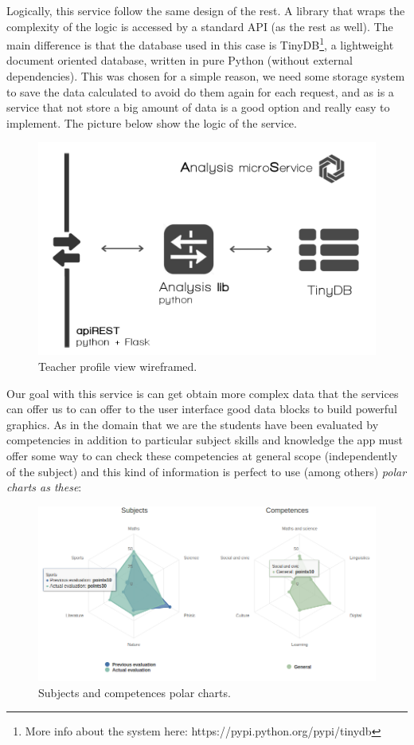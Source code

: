Logically, this service follow the same design of the rest. A library that wraps
the complexity of the logic is accessed by a standard API (as the rest as well).
The main difference is that the database used in this case is TinyDB\footnote{More
info about the system here: https://pypi.python.org/pypi/tinydb}, a lightweight
document oriented database, written in pure Python (without external dependencies).
\intro
This was chosen for a simple reason, we need some storage system to save the data
calculated to avoid do them again for each request, and as is a service that not
store a big amount of data is a good option and really easy to implement.
The picture below show the logic of the service.

\begin{figure}[H]
  \includegraphics[scale=0.3]{img/graphics/ams.png}
  \centering
  \caption{Teacher profile view wireframed.}
\end{figure}

\noindent Our goal with this service is can get obtain more complex data that the services
can offer us to can offer to the user interface good data blocks to build powerful
graphics.  As in the domain that we are the students have been evaluated by
competencies in addition to particular subject skills and knowledge the app must
offer some way to can check these competencies at general scope (independently of
the subject) and this kind of information is perfect to use (among others)
\textit{polar charts as these}:

\begin{figure}[H]
  \includegraphics[scale=0.45]{img/graphics/polar.png}
  \centering
  \caption{Subjects and competences polar charts.}
\end{figure}

